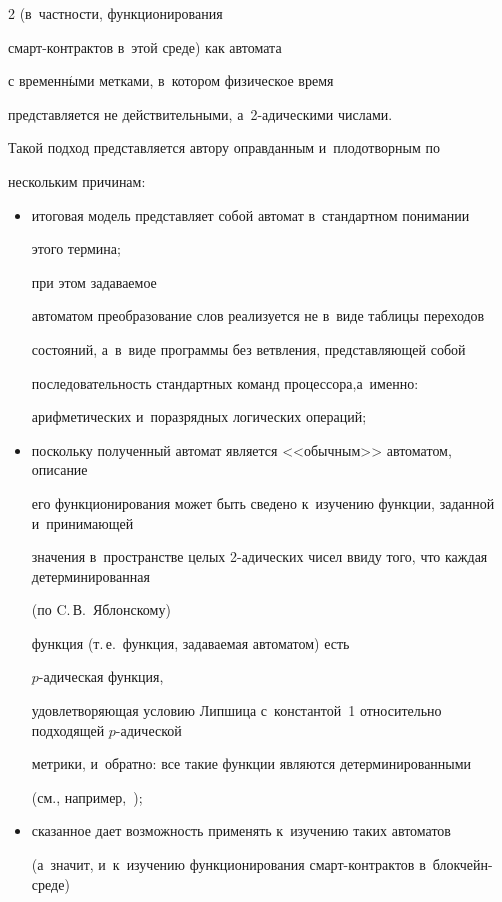 \begin{multicols}{2}
(в~частности,  функционирования


смарт-кон\-трак\-тов в~этой среде) как автомата


с временн$\acute{\mbox{ы}}$ми метками,  в~котором физическое время 


представляется не действительными, а~2-ади\-че\-ски\-ми числами.


Такой подход представляется автору оправданным и~плодотворным по


нескольким причинам:


\begin{itemize}


\item итоговая модель представляет собой автомат в~стандартном понимании


этого термина;


при этом задаваемое


автоматом преобразование слов  реализуется не в~виде таблицы переходов


состояний, а~в~виде программы без вет\-вле\-ния, пред\-став\-ля\-ющей собой


последовательность стандартных команд процессора,\linebreak а~именно:


арифметических и~поразрядных логических операций;


\item поскольку полученный автомат является <<обычным>> автоматом, описание


его функционирования может быть сведено к~изучению функции, заданной и~принимающей


значения в~пространстве целых 2-ади\-че\-ских чисел ввиду того, что каждая детерминированная


(по C.\,В.~Яблонскому)


функция (т.\,е.\ функция, задаваемая автоматом) есть


$p$-ади\-че\-ская функция,


удовлетворяющая  условию Липшица с~константой~1 относительно подходящей $p$-ади\-че\-ской


метрики, и~обратно: все такие функции являются детерминированными 


(см., например,~\cite{me:Discr_Syst});


\item сказанное дает возможность применять к~изуче\-нию таких автоматов


(а~значит, и~к~изуче\-нию функционирования смарт-кон\-трак\-тов в~блок\-чейн-сре\-де) 



\end{itemize}
\end{multicols}

